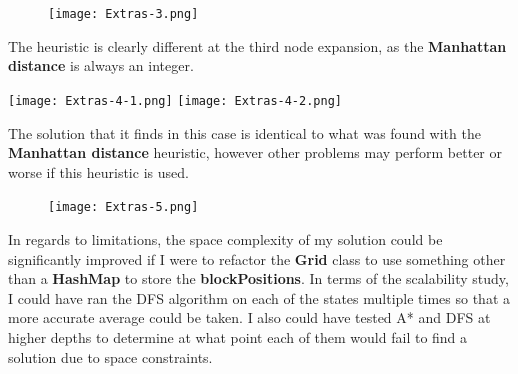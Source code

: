 \documentclass{article}
\begin{document}
	\begin{figure}[h]	
		\centering
		\texttt{[image: Extras-3.png]}
	\end{figure}

	The heuristic is clearly different at the third node expansion, as the \textbf{Manhattan distance} is always an integer.
	\begin{multicols}{2}[\columnsep=2cm]
		\texttt{[image: Extras-4-1.png]}
		\columnbreak
		\texttt{[image: Extras-4-2.png]}
	\end{multicols}

	\newpage
	The solution that it finds in this case is identical to what was found with the \textbf{Manhattan distance} heuristic, however other problems may perform better or worse if this heuristic is used.
	\begin{figure}[h]	
		\centering
		\texttt{[image: Extras-5.png]}
	\end{figure}

	In regards to limitations, the space complexity of my solution could be significantly improved if I were to refactor the \textbf{Grid} class to use something other than a \textbf{HashMap} to store the \textbf{blockPositions}. In terms of the scalability study, I could have ran the DFS algorithm on each of the states multiple times so that a more accurate average could be taken. I also could have tested A* and DFS at higher depths to determine at what point each of them would fail to find a solution due to space constraints.
	
\end{document}
